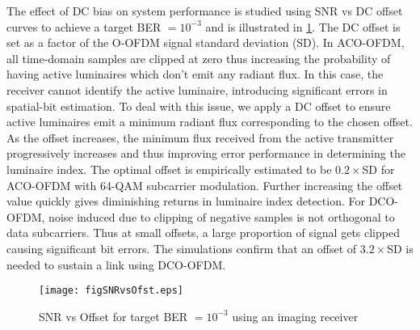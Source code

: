 The effect of DC bias on system performance is studied using SNR vs DC offset curves to achieve a target BER $=10^{-3}$ and is illustrated in \figurename{\ref{fig:SNRvsOfst}}. The DC offset is set as a factor of the O-OFDM signal standard deviation (SD). In ACO-OFDM, all time-domain samples are clipped at zero thus increasing the probability of having active luminaires which don't emit any radiant flux. In this case, the receiver cannot identify the active luminaire, introducing significant errors in spatial-bit estimation. To deal with this issue, we apply a DC offset to ensure active luminaires emit a minimum radiant flux corresponding to the chosen offset. As the offset increases, the minimum flux received from the active transmitter progressively increases and thus improving error performance in determining the luminaire index. The optimal offset is empirically estimated to be $0.2\times$SD for ACO-OFDM with 64-QAM subcarrier modulation. Further increasing the offset value quickly gives diminishing returns in luminaire index detection. For DCO-OFDM, noise induced due to clipping of negative samples is not orthogonal to data subcarriers. Thus at small offsets, a large proportion of signal gets clipped causing significant bit errors. The simulations confirm that an offset of $3.2\times$SD is needed to sustain a link using DCO-OFDM.

\begin{figure}[!t]
\centering
		\texttt{[image: figSNRvsOfst.eps]}
\caption{SNR vs Offset for target BER $= 10^{-3}$ using an imaging receiver}
	\label{fig:SNRvsOfst}
\end{figure}

